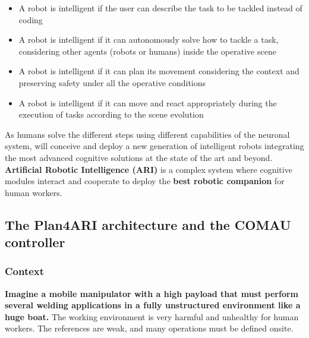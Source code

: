 \begin{itemize}
\item
  A robot is intelligent if the user can describe the task to be tackled
  instead of coding
\item
  A robot is intelligent if it can autonomously solve how to tackle a
  task, considering other agents (robots or humans) inside the operative
  scene
\item
  A robot is intelligent if it can plan its movement considering the
  context and preserving safety under all the operative conditions
\item
  A robot is intelligent if it can move and react appropriately during
  the execution of tasks according to the scene evolution
\end{itemize}

As humans solve the different steps using different capabilities of the
neuronal system,  will conceive and deploy a new
generation of intelligent robots integrating the most advanced cognitive
solutions at the state of the art and beyond. \textbf{Artificial Robotic
Intelligence (ARI)} is a complex system where cognitive modules interact
and cooperate to deploy the \textbf{best robotic companion} for human
workers.

\subsection{The Plan4ARI architecture and the COMAU
controller}\label{the-plan4ari-architecture-and-the-comau-controller}

\subsubsection{Context}\label{context}

\textbf{Imagine a mobile manipulator with a high payload that must
perform several welding applications in a fully unstructured environment
like a huge boat.} The working environment is very harmful and unhealthy
for human workers. The references are weak, and many operations must be
defined onsite.

